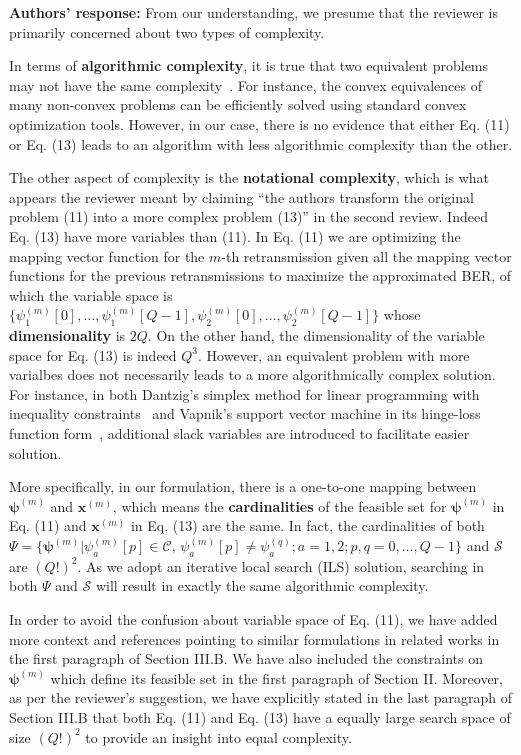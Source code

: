 \documentclass[onecolumn, 11pt, draftclsnofoot]{IEEEtran}
\begin{document}
\noindent \textbf{Authors' response:}
From our understanding, we presume that the reviewer is primarily concerned
about two types of complexity.

In terms of \textbf{algorithmic complexity}, it is true that two
equivalent problems may not have the same
complexity~\citep[R][Sec. 4.1.3]{boyd2004convex}. For instance, the convex
equivalences of many non-convex problems can be efficiently solved using
standard convex optimization tools. However, in our case, there is no evidence
that either Eq. (11) or Eq. (13) leads to an algorithm with less
algorithmic complexity than the other.

The other aspect of complexity is the \textbf{notational complexity}, which is
what appears the reviewer meant by claiming ``the authors transform the
original problem (11) into a more complex problem (13)'' in the second review.
Indeed Eq. (13) have more variables than (11). In Eq. (11) we are
optimizing the mapping vector function for the $m$-th retransmission given all the mapping
vector functions for the previous retransmissions to maximize the approximated
BER, of which the variable space is $\{\psi_1^{(m)}[0], \ldots,
\psi_1^{(m)}[Q-1], \psi_2^{(m)}[0], \ldots, \psi_2^{(m)}[Q-1]\}$ whose
\textbf{dimensionality} is $2Q$. On the other hand, the dimensionality of the
variable space for Eq. (13) is indeed $Q^3$. However, an equivalent problem with
more varialbes does not necessarily leads to a more algorithmically complex
solution. For instance, in both Dantzig's simplex method for linear
programming with inequality constraints~\citep[R][]{gass1958linear} and Vapnik's
support vector machine in its hinge-loss function form~\citep[R][Eq.
(12.25)]{friedman2001elements}, additional slack variables are introduced to
facilitate easier solution.
  
More specifically, in our formulation, there is a
one-to-one mapping between $\bm{\psi}^{(m)}$ and $\mathbf{x}^{(m)}$, which
means the \textbf{cardinalities} of the feasible set for $\bm{\psi}^{(m)}$ in
Eq. (11) and $\mathbf{x}^{(m)}$ in Eq. (13) are the same. In fact, the
cardinalities of both $\Psi = \{\bm{\psi}^{(m)}| \psi_a^{(m)}[p]\in
\mathcal{C},\, \psi_a^{(m)}[p] \not= \psi_a^{(q)}; a=1,2; p,q =
0,\ldots,Q-1\}$ and $\mathcal{S}$ are $(Q!)^2$. As we adopt an iterative local
search (ILS) solution, searching in both $\Psi$ and $\mathcal{S}$ will result
in exactly the same algorithmic complexity.

In order to avoid the confusion about variable space of Eq. (11), we have
added more context and references pointing to similar formulations in related
works in the first paragraph of Section III.B. We have also included the
constraints on $\bm{\psi}^{(m)}$ which define its feasible set in the first
paragraph of Section II. Moreover, as per the reviewer's suggestion, we have
explicitly stated in the last paragraph of Section III.B that both Eq. (11) and
Eq. (13) have a equally large search space of size $(Q!)^2$ to provide an
insight into equal complexity.
\end{document}

